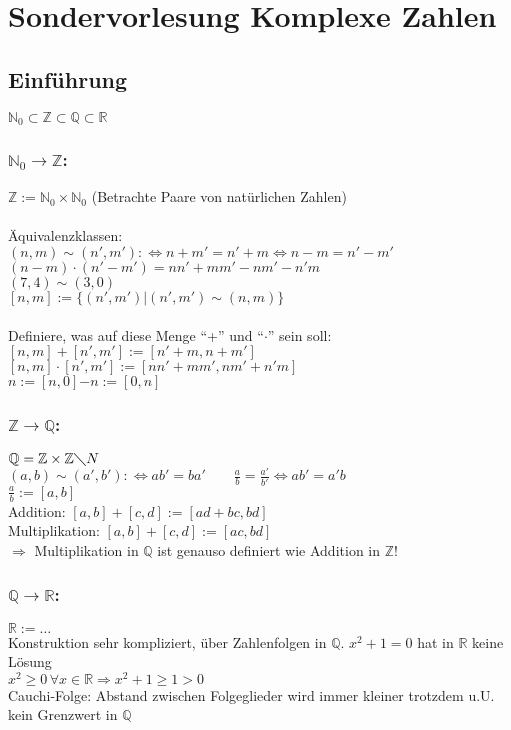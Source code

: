 \section{Sondervorlesung Komplexe Zahlen}
%
%
%
\subsection{Einführung}
$\mathbb{N}_{0}\subset\mathbb{Z}\subset\mathbb{Q}\subset\mathbb{R}$
%
%
%
\subsubsection{$\mathbb{N}_{0}\rightarrow\mathbb{Z}$:}
$\mathbb{Z}:=\mathbb{N}_{0}\times\mathbb{N}_{0}$ (Betrachte Paare von natürlichen Zahlen)\\
\qquad\\
Äquivalenzklassen:\\
$(n,m)\sim(n',m'):\Leftrightarrow n+m' = n'+m \Leftrightarrow n-m=n'-m'$\\
$(n-m)\cdot(n'-m')=nn'+mm'-nm'-n'm$\\
$(7,4)\sim(3,0)$\\
$[n,m]:=\{(n',m')|(n',m')\sim(n,m)\}$\\
\qquad\\
Definiere, was auf diese Menge "`+"' und "`$\cdot$"' sein soll:\\
$[n,m]+[n',m']:=[n'+m,n+m']$\\
$[n,m]\cdot[n',m']:=[nn'+mm',nm'+n'm]$\\
$n:=[n,0]$\qquad $-n:=[0,n]$
%
%
%
\subsubsection{$\mathbb{Z}\rightarrow\mathbb{Q}$:}
$\mathbb{Q}=\mathbb{Z}\times\mathbb{Z}\diagdown N$\\
$(a,b)\sim(a',b'):\Leftrightarrow ab'=ba' \qquad \frac{a}{b}=\frac{a'}{b'}\Leftrightarrow ab'=a'b$\\
$\frac{a}{b}:=[a,b]$\\
Addition: $[a,b]+[c,d]:=[ad+bc,bd]$\\
Multiplikation: $[a,b]+[c,d]:=[ac,bd]$\\
$\Rightarrow$ Multiplikation in $\mathbb{Q}$ ist genauso definiert wie Addition in $\mathbb{Z}$!
%
%
%
\subsubsection{$\mathbb{Q}\rightarrow\mathbb{R}$:}
$\mathbb{R}:=\dotsc$\\
Konstruktion sehr kompliziert, über Zahlenfolgen in $\mathbb{Q}$.
$x^{2}+1=0$ hat in $\mathbb{R}$ keine Lösung\\
$x^{2}\geq0 \, \forall x\in \mathbb{R}\Rightarrow x^{2}+1\geq1>0$\\
Cauchi-Folge: Abstand zwischen Folgeglieder wird immer kleiner trotzdem u.U. kein Grenzwert in $\mathbb{Q}$
%
%
%
